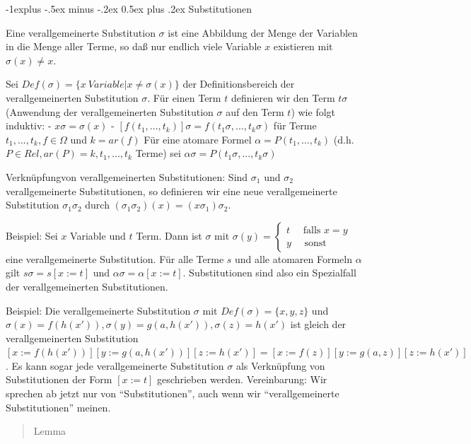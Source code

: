 \documentclass[a4paper]{article}
\makeatletter
\renewcommand{\subsection}{\@startsection{subsection}{2}{0mm}%
                {-1explus -.5ex minus -.2ex}%
                {0.5ex plus .2ex}%
                {\normalfont\normalsize\bfseries}}
\makeatother
\begin{document}
\begin{multicols}{3}
  \subsection{Substitutionen}\label{substitutionen-1}

  Eine verallgemeinerte Substitution $\sigma$ ist eine Abbildung der Menge
  der Variablen in die Menge aller Terme, so daß nur endlich viele
  Variable $x$ existieren mit $\sigma(x) \not=x$.

  Sei $Def(\sigma)=\{x\ Variable|x\not =\sigma(x)\}$ der
  Definitionsbereich der verallgemeinerten Substitution $\sigma$. Für
  einen Term $t$ definieren wir den Term $t\sigma$ (Anwendung der
  verallgemeinerten Substitution $\sigma$ auf den Term $t$) wie folgt
  induktiv: - $x\sigma=\sigma(x)$ -
  $[f(t_1 ,... ,t_k)]\sigma=f(t_1\sigma,... ,t_k\sigma)$ für Terme
  $t_1,... ,t_k,f\in\Omega$ und $k=ar(f)$ Für eine atomare Formel
  $\alpha=P(t_1 ,... ,t_k)$ (d.h. $P\in Rel,ar(P) =k,t_1 ,... ,t_k$ Terme)
  sei $\alpha\sigma = P(t_1\sigma,... ,t_k\sigma)$

  Verknüpfungvon verallgemeinerten Substitutionen: Sind $\sigma_1$ und
  $\sigma_2$ verallgemeinerte Substitutionen, so definieren wir eine neue
  verallgemeinerte Substitution $\sigma_1 \sigma_2$ durch
  $(\sigma_1 \sigma_2)(x) = (x\sigma_1)\sigma_2$.

  Beispiel: Sei $x$ Variable und $t$ Term. Dann ist $\sigma$ mit
  $\sigma(y) =\begin{cases} t \quad\text{ falls } x=y \\ y \quad\text{ sonst }\end{cases}$
  eine verallgemeinerte Substitution. Für alle Terme $s$ und alle atomaren
  Formeln $\alpha$ gilt $s\sigma=s[x:=t]$ und $\alpha\sigma=\alpha[x:=t]$.
  Substitutionen sind also ein Spezialfall der verallgemeinerten
  Substitutionen.

  Beispiel: Die verallgemeinerte Substitution $\sigma$ mit
  $Def(\sigma)=\{x,y,z\}$ und
  $\sigma(x) =f(h(x')), \sigma(y) =g(a,h(x')), \sigma(z) =h(x')$ ist
  gleich der verallgemeinerten Substitution
  $[x:=f(h(x'))] [y:=g(a,h(x'))] [z:=h(x')] = [x:=f(z)] [y:=g(a,z)] [z:=h(x')]$.
  Es kann sogar jede verallgemeinerte Substitution $\sigma$ als
  Verknüpfung von Substitutionen der Form $[x:=t]$ geschrieben werden.
  Vereinbarung: Wir sprechen ab jetzt nur von ``Substitutionen'', auch
  wenn wir ``verallgemeinerte Substitutionen'' meinen.

  \begin{quote}
    Lemma


\end{quote}
\end{multicols}
\end{document}
